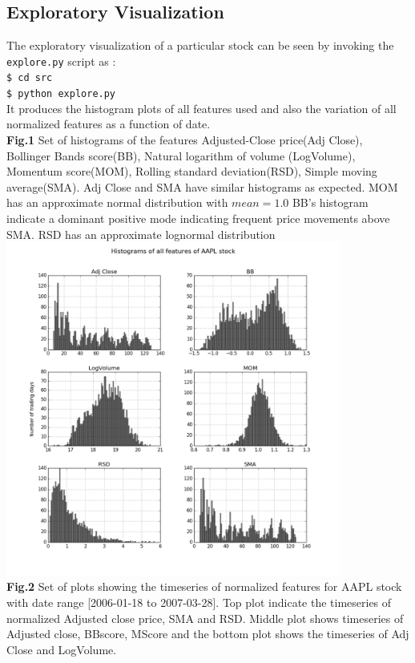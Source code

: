 \documentclass[10pt]{report}
\begin{document}
\subsection*{Exploratory Visualization}
The exploratory visualization of a particular stock can be seen by invoking the \texttt{explore.py} script as :\\
\texttt{\$ cd src\\
\$ python explore.py}\\
It produces the histogram plots of all features used and also the variation of all normalized features as a function of date.\\
\textbf{Fig.1} Set of histograms of the features Adjusted-Close price(Adj Close), Bollinger Bands score(BB), Natural logarithm of volume (LogVolume), Momentum score(MOM), Rolling standard deviation(RSD), Simple moving average(SMA). Adj Close and SMA have similar histograms as expected. MOM has an approximate normal distribution with $mean = 1.0$ BB's histogram indicate a dominant positive mode indicating frequent price movements above SMA. RSD has an approximate lognormal distribution\\
\includegraphics[width=11cm]{plots/histograms.png}\\
\textbf{Fig.2} Set of plots showing the timeseries of normalized features for AAPL stock with date range [2006-01-18 to 2007-03-28]. Top plot indicate the timeseries of normalized Adjusted close price, SMA and RSD. Middle plot shows timeseries of Adjusted close, BBscore, MScore and the bottom plot shows the timeseries of Adj Close and LogVolume.\\
\end{document}

